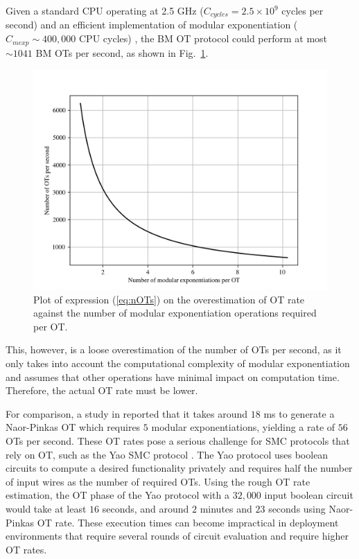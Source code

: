 Given a standard CPU operating at 2.5 GHz ($C_{cycles} = 2.5 \times 10^9$ cycles per second) and an efficient implementation of modular exponentiation ($C_{mexp} \sim 400,000$ CPU cycles) \cite{G11}, the BM OT protocol could perform at most $\sim 1041$ BM OTs per second, as shown in Fig.~\ref{fig:nOTsplot}.
\begin{figure}[]
\centering
\includegraphics[width=1\textwidth]{Chapter_QuantumAndClassicalObliviousTransfer/nOTperSeccond.png}
\caption{Plot of expression (\ref{eq:nOTs}) on the overestimation of OT rate against the number of modular exponentiation operations required per OT.}
\label{fig:nOTsplot}
\end{figure}
This, however, is a loose overestimation of the number of OTs per second, as it only takes into account the computational complexity of modular exponentiation and assumes that other operations have minimal impact on computation time. Therefore, the actual OT rate must be lower.

For comparison, a study in \cite{ALSZ13} reported that it takes around $18$ ms to generate a Naor-Pinkas OT \cite{NP01} which requires $5$ modular exponentiations, yielding a rate of $56$ OTs per second. These OT rates pose a serious challenge for SMC protocols that rely on OT, such as the Yao SMC protocol \cite{Yao82}. The Yao protocol uses boolean circuits to compute a desired functionality privately and requires half the number of input wires as the number of required OTs. Using the rough OT rate estimation, the OT phase of the Yao protocol with a $32,000$ input boolean circuit would take at least $16$ seconds, and around $2$ minutes and $23$ seconds using Naor-Pinkas OT rate. These execution times can become impractical in deployment environments that require several rounds of circuit evaluation and require higher OT rates.



